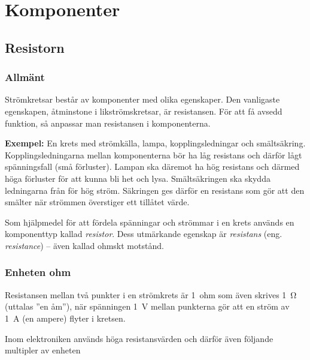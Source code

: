 \chapter{Komponenter}
\label{komponenter}

\section{Resistorn}
\label{resistorn}

\subsection{Allmänt}

Strömkretsar består av komponenter med olika egenskaper.
Den vanligaste egenskapen, åtminstone i likströmskretsar, är resistansen.
För att få avsedd funktion, så anpassar man resistansen i komponenterna.

\textbf{Exempel:} En krets med strömkälla, lampa, kopplingsledningar och smältsäkring.
Kopplingsledningarna mellan komponenterna bör ha låg resistans och därför lågt
spänningsfall (små förluster).
Lampan ska däremot ha hög resistans och därmed höga förluster för att kunna bli
het och lysa.
Smältsäkringen ska skydda ledningarna från för hög ström.
Säkringen ges därför en resistans som gör att den smälter när strömmen
överstiger ett tillåtet värde.

Som hjälpmedel för att fördela spänningar och strömmar i en krets används
en komponenttyp kallad \emph{resistor}.
Dess utmärkande egenskap är \emph{resistans} (eng. \emph{resistance}) --
även kallad ohmskt motstånd.

\subsection{Enheten ohm}
\label{enheten_ohm}


Resistansen mellan två punkter i en strömkrets är 1~ohm som även skrives
\qty{1}{\ohm} (uttalas ''en åm''), när spänningen \qty{1}{\volt} mellan
punkterna gör att en ström av \qty{1}{\ampere} (en ampere) flyter i kretsen.

Inom elektroniken används höga resistansvärden och därför även följande
multipler av enheten

